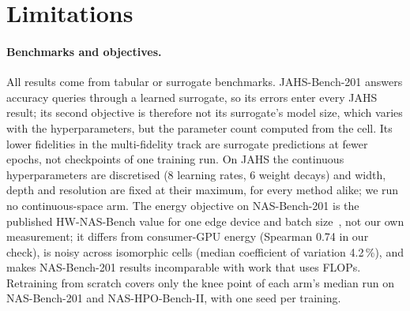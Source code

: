 
\section{Limitations}
\label{sec:limitations}

\paragraph{Benchmarks and objectives.} All results come from tabular or surrogate benchmarks. JAHS-Bench-201 answers
accuracy queries through a learned surrogate, so its errors enter every JAHS result; its second objective is
therefore not its surrogate's model size, which varies with the hyperparameters, but the parameter count computed
from the cell. Its lower fidelities in the multi-fidelity track are surrogate predictions at fewer epochs, not
checkpoints of one training run. On JAHS the continuous hyperparameters are
discretised (8 learning rates, 6 weight decays) and width, depth and resolution are fixed at their maximum, for every
method alike; we run no continuous-space arm. The energy objective on NAS-Bench-201 is the published HW-NAS-Bench
value for one edge device and batch size~\citep{li2021hwnasbench}, not our own measurement; it differs from
consumer-GPU energy (Spearman 0.74 in our check), is noisy across isomorphic cells (median coefficient of variation
4.2\,\%), and makes NAS-Bench-201 results incomparable with work that uses FLOPs. Retraining from scratch covers only
the knee point of each arm's median run on NAS-Bench-201 and NAS-HPO-Bench-II, with one seed per training.

